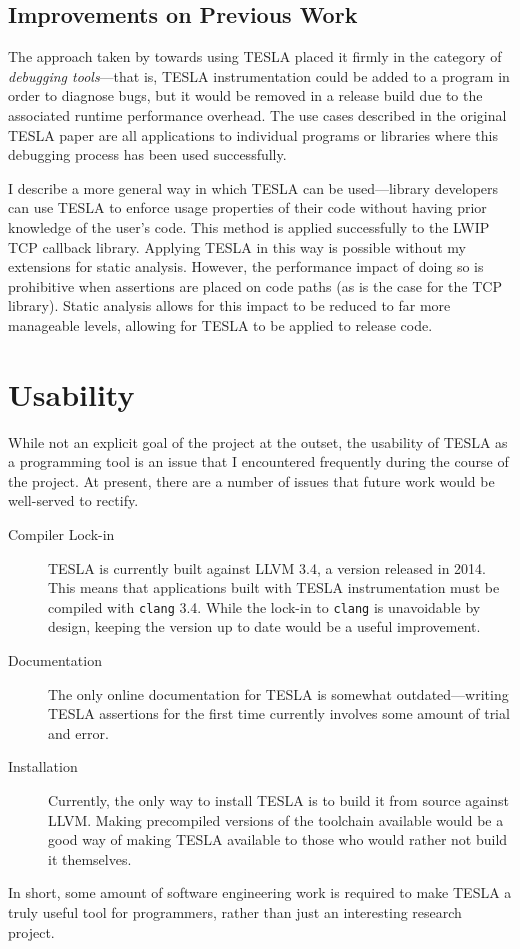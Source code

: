 \subsection{Improvements on Previous Work}

The approach taken by \textcite{anderson_tesla:_2014} towards using TESLA placed
it firmly in the category of \emph{debugging tools}---that is, TESLA
instrumentation could be added to a program in order to diagnose bugs, but it
would be removed in a release build due to the associated runtime performance
overhead. The use cases described in the original TESLA paper are all
applications to individual programs or libraries where this debugging process
has been used successfully.

I describe a more general way in which TESLA can be used---library developers
can use TESLA to enforce usage properties of their code without having prior
knowledge of the user's code. This method is applied successfully to the LWIP
TCP callback library. Applying TESLA in this way is possible
without my extensions for static analysis. However, the performance impact of
doing so is prohibitive when assertions are placed on  code paths
(as is the case for the TCP library). Static analysis allows for this impact to
be reduced to far more manageable levels, allowing for TESLA to be applied to
release code.

\section{Usability}

While not an explicit goal of the project at the outset, the usability of TESLA
as a programming tool is an issue that I encountered frequently during the
course of the project. At present, there are a number of issues that future work
would be well-served to rectify.
\begin{description}
  \item[Compiler Lock-in] TESLA is currently built against LLVM 3.4, a version
  released in 2014. This means that applications built with TESLA
  instrumentation must be compiled with \texttt{clang} 3.4. While the lock-in to
  \texttt{clang} is unavoidable by design, keeping the version up to date would
  be a useful improvement.
  
  \item[Documentation] The only online documentation for TESLA is somewhat
  outdated---writing TESLA assertions for the first time currently involves some
  amount of trial and error.

  \item[Installation] Currently, the only way to install TESLA is to build it
  from source against LLVM. Making precompiled versions of the toolchain
  available would be a good way of making TESLA available to those who would
  rather not build it themselves.
\end{description}

In short, some amount of software engineering work is required to make TESLA a
truly useful tool for programmers, rather than just an interesting research
project.
